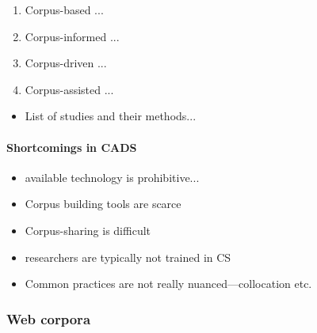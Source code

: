
			\begin{enumerate}
				\item Corpus-based ...
				\item Corpus-informed ...
				\item Corpus-driven ...
				\item Corpus-assisted ...
			\end{enumerate}

			\begin{itemize}
				\item List of studies and their methods...
			\end{itemize}

			\paragraph{Shortcomings in CADS}

				\begin{itemize}
					\item available technology is prohibitive...
					\item Corpus building tools are scarce
					\item Corpus-sharing is difficult
					\item researchers are typically not trained in CS
					\item Common practices are not really nuanced---collocation etc.
				\end{itemize}

		\subsubsection{Web corpora}







%
